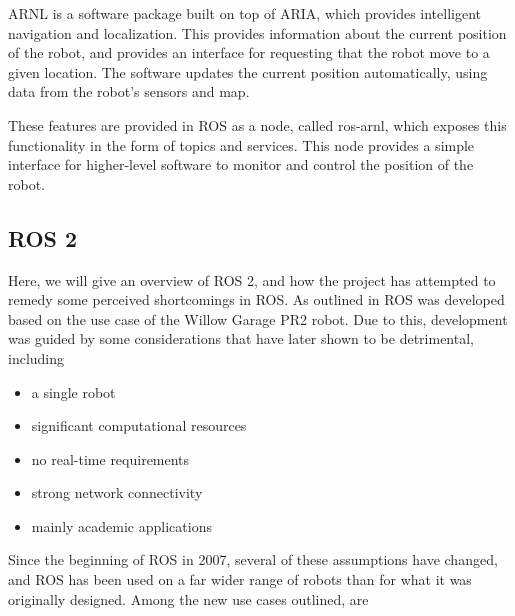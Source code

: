 \documentclass[\rootfolder/main.tex]{subfiles}
\begin{document}
ARNL is a software package built on top of ARIA, which provides intelligent navigation and localization.
This provides information about the current position of the robot, and provides an interface for requesting that the robot move to a given location.
The software updates the current position automatically, using data from the robot's sensors and map.

These features are provided in ROS as a node, called ros-arnl, which exposes this functionality in the form of topics and services.
This node provides a simple interface for higher-level software to monitor and control the position of the robot.


\subsection{ROS 2}

Here, we will give an overview of ROS 2, and how the project has attempted to remedy some perceived shortcomings in ROS.
As outlined in \cite{Gerkey2017} ROS was developed based on the use case of the Willow Garage PR2 robot.
Due to this, development was guided by some considerations that have later shown to be detrimental, including

\begin{itemize}
    \item a single robot
    \item significant computational resources
    \item no real-time requirements
    \item strong network connectivity
    \item mainly academic applications
\end{itemize}

Since the beginning of ROS in 2007, several of these assumptions have changed, and ROS has been used on a far wider range of robots than for what it was originally designed.
Among the new use cases outlined, are
\end{document}
